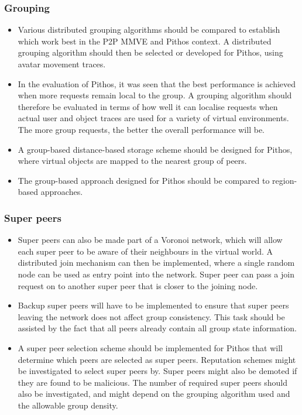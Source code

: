 \subsubsection{Grouping}
\begin{itemize}
\item Various distributed grouping algorithms should be compared to establish which work best in the P2P MMVE and Pithos context. A distributed grouping algorithm should then be selected or developed for Pithos, using avatar movement traces.
    
\item In the evaluation of Pithos, it was seen that the best performance is achieved when more requests remain local to the group. A grouping algorithm should therefore be evaluated in terms of how well it can localise requests when actual user and object traces are used for a variety of virtual environments. The more group requests, the better the overall performance will be.

\item A group-based distance-based storage scheme should be designed for Pithos, where virtual objects are mapped to the nearest group of peers.

\item The group-based approach designed for Pithos should be compared to region-based approaches.
\end{itemize}

\subsubsection{Super peers}
\begin{itemize}
\item Super peers can also be made part of a Voronoi network, which will allow each super peer to be aware of their neighbours in the virtual world. A distributed join mechanism can then be implemented, where a single random node can be used as entry point into the network. Super peer can pass a join request on to another super peer that is closer to the joining node.
    
\item Backup super peers will have to be implemented to ensure that super peers leaving the network does not affect group consistency. This task should be assisted by the fact that all peers already contain all group state information.
    
\item A super peer selection scheme should be implemented for Pithos that will determine which peers are selected as super peers. Reputation schemes might be investigated to select super peers by. Super peers might also be demoted if they are found to be malicious. The number of required super peers should also be investigated, and might depend on the grouping algorithm used and the allowable group density.
\end{itemize}

